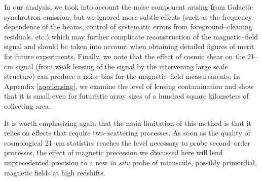 In our analysis, we took into account the noise component arising from Galactic synchrotron emission, but we ignored more subtle effects (such as the frequency dependence of the beams, control of systematic errors from foreground--cleaning residuals, etc.) which may further complicate reconstruction of the magnetic--field signal and should be taken into account when obtaining detailed figures of merit for future experiments.
Finally, we note that the effect of cosmic shear on the 21--cm signal (from weak lensing of the signal by the intervening large scale structure) can produce a noise bias for the magnetic--field measurements. In Appendix \ref{app:lensing}, we examine the level of lensing contamination and show that it is small even for futuristic array sizes of a hundred square kilometers of collecting area. 

It is worth emphasizing again that the main limitation of this method is that it relies on effects that require two--scattering processes. As soon as the quality of cosmological 21--cm statistics reaches the level necessary to probe second--order processes, the effect of magnetic precession we discussed here will lend unprecedented precision to a new \textit{in situ} probe of minuscule, possibly primordial, magnetic fields at high redshifts. 

  